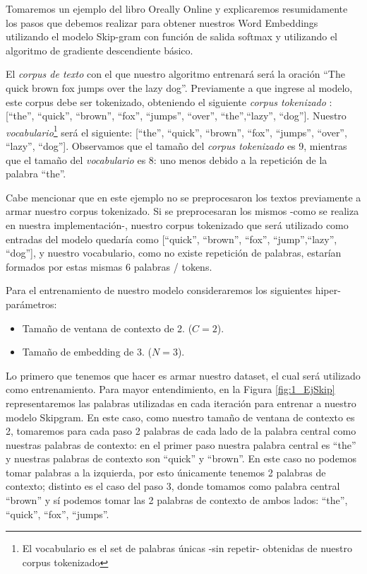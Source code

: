 \documentclass[12pt,a4paper]{article}
\begin{document}
\begin{sloppypar}
Tomaremos un ejemplo del libro Oreally Online y explicaremos resumidamente los pasos que debemos realizar para obtener nuestros Word Embeddings utilizando el modelo Skip-gram con función de salida softmax y utilizando el algoritmo de gradiente descendiente básico.

El \textit{corpus de texto} con el que nuestro algoritmo entrenará será la oración “The quick brown fox jumps over the lazy dog”. Previamente a que ingrese al modelo, este corpus debe ser tokenizado, obteniendo el siguiente \textit{corpus tokenizado} : [“the”, “quick”, “brown”, “fox”, “jumps”, “over”, “the”,“lazy”, “dog”]. Nuestro \textit{vocabulario}\footnote{El vocabulario es el set de palabras únicas -sin repetir- obtenidas de nuestro corpus tokenizado} será el siguiente: [“the”, “quick”, “brown”, “fox”, “jumps”, “over”, “lazy”, “dog”]. Observamos que el tamaño del \textit{corpus tokenizado} es 9, mientras que el tamaño del \textit{vocabulario} es 8: uno menos debido a la repetición de la palabra “the”. 

Cabe mencionar que en este ejemplo no se preprocesaron los textos previamente a armar nuestro corpus tokenizado. Si se preprocesaran los mismos -como se realiza en nuestra implementación-, nuestro corpus tokenizado que será utilizado como entradas del modelo quedaría como [“quick”, “brown”, “fox”, “jump”,“lazy”, “dog”], y nuestro vocabulario, como no existe repetición de palabras, estarían formados por estas mismas 6 palabras / tokens.

Para el entrenamiento de nuestro modelo consideraremos los siguientes hiper-parámetros:
\begin{itemize}
\item Tamaño de ventana de contexto de 2. ($C=2$).
\item Tamaño de embedding de 3. ($N=3$).
\end{itemize}

Lo primero que tenemos que hacer es armar nuestro dataset, el cual será utilizado como entrenamiento. Para mayor entendimiento, en la Figura \ref{fig:1_EjSkip} representaremos las palabras utilizadas en cada iteración para entrenar a nuestro modelo Skipgram. En este caso, como nuestro tamaño de ventana de contexto es 2, tomaremos para cada paso 2 palabras de cada lado de la palabra central como nuestras palabras de contexto: en el primer paso nuestra palabra central es “the” y nuestras palabras de contexto son “quick” y “brown”. En este caso no podemos tomar palabras a la izquierda, por esto únicamente tenemos 2 palabras de contexto; distinto es el caso del paso 3, donde tomamos como palabra central “brown” y sí podemos tomar las 2 palabras de contexto de ambos lados: “the”, “quick”, “fox”, “jumps”. 


\end{sloppypar}
\end{document}
